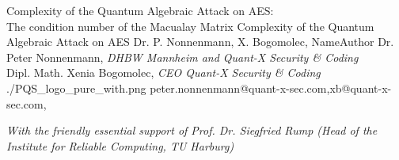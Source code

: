 \documentclass[a4paper,11pt]{article}
\begin{document}
\setcounter{footnote}{0}
\setcounter{figure}{0}



\Aufsatz 
{Complexity of the Quantum Algebraic Attack on AES:\\
The condition number of the Macualay Matrix}
{Complexity of the Quantum Algebraic Attack on AES}
{Dr. P. Nonnenmann, X. Bogomolec,}
{NameAuthor}
{Dr. Peter Nonnenmann,
{\small \textit{DHBW Mannheim and Quant-X Security {\&} Coding}} \\
Dipl. Math. Xenia Bogomolec, 
{\small \textit{CEO Quant-X Security {\&} Coding}} \\}
{./PQS_logo_pure_with.png}
{peter.nonnenmann@quant-x-sec.com,xb@quant-x-sec.com,} 

\noindent
{\small \textit{With the friendly essential support of Prof. Dr. Siegfried Rump (Head of the Institute for Reliable Computing, TU Harburg) }}
\end{document}
